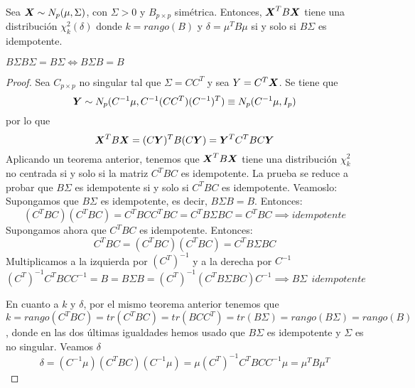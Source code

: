\begin{nth}
  Sea $\boldsymbol{X} \sim N_p(\mu,\Sigma)$, con $\Sigma > 0$ y $B_{p\times p}$ simétrica. Entonces, $\boldsymbol{X}^T B \boldsymbol{X}$ tiene una distribución $\chi_k^2(\delta)$ donde $k = rango(B)$ y $\delta = \mu^T B \mu$ si y solo si $B\Sigma$ es idempotente.
  \begin{nota}
    $B\Sigma B\Sigma = B\Sigma \iff B\Sigma B = B$
  \end{nota}
\end{nth}
\begin{proof}
  Sea $C_{p\times p }$ no singular tal que $\Sigma = C C^T$ y sea $Y = C^T \boldsymbol{X}$. Se tiene que
  \[
  \boldsymbol{Y} \sim N_p(C^{-1}\mu, C^{-1}(CC^T)(C^{-1})^T) \equiv N_p(C^{-1}\mu, I_p)
  \]
  por lo que
  \[
  \boldsymbol{X}^T B \boldsymbol{X} = (C\boldsymbol{Y})^TB(C\boldsymbol{Y}) = \boldsymbol{Y}^T C^T B C \boldsymbol{Y}
  \]
  Aplicando un teorema anterior, tenemos que $\boldsymbol{X}^T B \boldsymbol{X}$ tiene una distribución $\chi^2_k$ no centrada si y solo si la matriz $C^T B C$ es idempotente. La prueba se reduce a probar que $B\Sigma$ es idempotente si y solo si $C^T B C$ es idempotente. Veamoslo:\\

  \boxed{\rightarrow} Supongamos que $B\Sigma$ es idempotente, es decir, $B\Sigma B = B$. Entonces:
  \[
  (C^TBC)(C^TBC) = C^TBCC^TBC = C^TB\Sigma BC = C^TBC \implies idempotente
  \]
  \boxed{\leftarrow} Supongamos ahora que $C^TBC$ es idempotente. Entonces:
  \[
  C^TBC = (C^TBC)(C^TBC) = C^TB\Sigma B C
  \]
  Multiplicamos a la izquierda por $(C^T)^{-1}$ y a la derecha por $C^{-1}$
  \[
  (C^T)^{-1}C^TBCC^{-1} = B = B\Sigma B = (C^T)^{-1}(C^T B \Sigma B C)C^{-1} \implies B \Sigma \ \ idempotente
  \]

  En cuanto a $k$ y $\delta$, por el mismo teorema anterior tenemos que
  \[
  k = rango(C^T B C) = tr(C^TBC) = tr(BCC^T) = tr(B\Sigma) = rango(B\Sigma) = rango(B)
  \], donde en las dos últimas igualdades hemos usado que $B\Sigma$ es idempotente y $\Sigma$ es no singular. Veamos $\delta$
  \[
  \delta = (C^{-1} \mu)(C^T B C)(C^{-1}\mu) = \mu(C^T)^{-1}C^T B CC^{-1}\mu = \mu^T B \mu^T
  \]
\end{proof}
